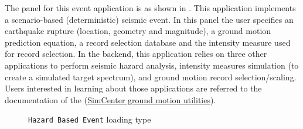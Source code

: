 The panel for this event application is as shown in
.  This application implements a scenario-based
(deterministic) seismic event.  In this panel the user specifies an
earthquake rupture (location, geometry and magnitude), a ground motion
prediction equation, a record selection database and the intensity
measure used for record selection.  In the backend, this application
relies on three other applications to perform seismic hazard analysis,
intensity measures simulation (to create a simulated target spectrum),
and ground motion record selection/scaling.  Users interested in
learning about those applications are referred to the documentation of
the
(\href{https://github.com/NHERI-SimCenter/GroundMotionUtilities/blob/master/Readme.md}{SimCenter
  ground motion utilities}).

\begin{figure}[!htbp]
  \caption{\texttt{Hazard Based Event} loading type}
  \label{fig:figure7}
\end{figure}
